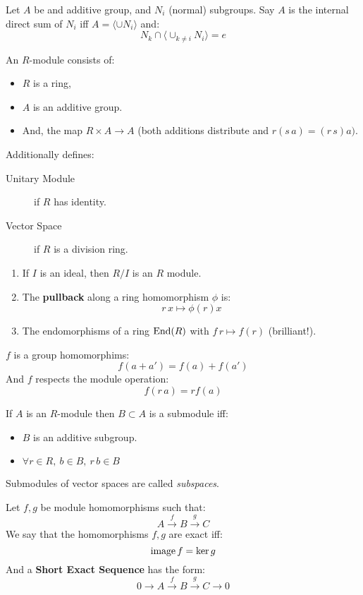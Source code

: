 \begin{ddef}
    Let $A$ be and additive group, and $N_i$ (normal) subgroups. Say $A$ is the internal direct sum of $N_i$ iff $A=\langle \cup N_i\rangle$ and:
    $$N_k \cap\langle \cup_{k\neq i}N_i\rangle=e $$
\end{ddef}

\begin{ddef}[Modules]
An $R$-module consists of:
\begin{itemize}
\item $R$ is a ring, 
\item $A$ is an additive group.
\item And, the map $R\times A \to A$ (both additions distribute and $r(s\,a)=(r\,s)a)$.
\end{itemize}
Additionally defines:
\begin{description}
    \item[Unitary Module] if $R$ has identity.
    \item[Vector Space] if $R$ is a division ring.
\end{description}
\end{ddef}

\begin{examples}
    \begin{enumerate}
        \item If $I$ is an ideal, then $R/I$ is an $R$ module.
        \item The \textbf{pullback} along a ring homomorphism $\phi$ is:
            $$r\,x \mapsto \phi(r)x$$
        \item The endomorphisms of a ring $\operatorname{End}(R)$ with $f\,r \mapsto f(r)$ (brilliant!). 
    \end{enumerate}
\end{examples}

\begin{ddef}
    $f$ is a group homomorphims:
    $$f(a+a') = f(a)+f(a')$$
    And $f$ respects the module operation:
    $$f(r\,a) = rf(a)$$
\end{ddef}

\begin{ddef}[Submodules]
    If $A$ is an $R$-module then $B\subset A$ is a submodule iff:
    \begin{itemize}
        \item $B$ is an additive subgroup.
        \item $\forall r\in R,\ b\in B,\ r\,b\in B$
    \end{itemize}
    Submodules of vector spaces are called \emph{subspaces}.
\end{ddef}

\begin{ddef}
    Let $f,g$ be module homomorphisms such that:
    $$A\xrightarrow{f} B \xrightarrow{g} C$$
    We say that the homomorphisms $f,g$ are exact iff:
    $$\operatorname{image} f = \ker g$$
    And a \textbf{Short Exact Sequence} has the form:
    $$0\to A\xrightarrow{f} B \xrightarrow{g} C\to 0$$
\end{ddef}
